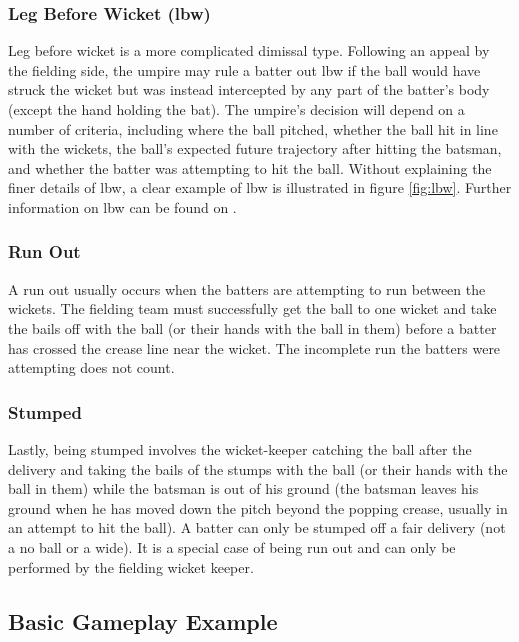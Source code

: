 \documentclass[12pt,a4paper]{report}
\theoremstyle{definition}
\begin{document}
\subsubsection{Leg Before Wicket (lbw)}

Leg before wicket is a more complicated dimissal type.
Following an appeal by the fielding side, the umpire may rule a batter out lbw if the ball would have struck the wicket but was instead intercepted by any part of the batter's body (except the hand holding the bat). 
The umpire's decision will depend on a number of criteria, including where the ball pitched, whether the ball hit in line with the wickets, the ball's expected future trajectory after hitting the batsman, and whether the batter was attempting to hit the ball.
Without explaining the finer details of lbw, a clear example of lbw is illustrated in figure \ref{fig:lbw}. 
Further information on lbw can be found on \citet{lbwWiki}.

\subsubsection{Run Out}

A run out usually occurs when the batters are attempting to run between the wickets.
The fielding team must successfully get the ball to one wicket and take the bails off with the ball (or their hands with the ball in them) before a batter has crossed the crease line near the wicket. 
The incomplete run the batters were attempting does not count.

\subsubsection{Stumped}

Lastly, being stumped involves the wicket-keeper catching the ball after the delivery and taking the bails of the stumps with the ball (or their hands with the ball in them) while the batsman is out of his ground (the batsman leaves his ground when he has moved down the pitch beyond the popping crease, usually in an attempt to hit the ball).
A batter can only be stumped off a fair delivery (not a no ball or a wide).
It is a special case of being run out and can only be performed by the fielding wicket keeper.

\subsection{Basic Gameplay Example}
\end{document}
